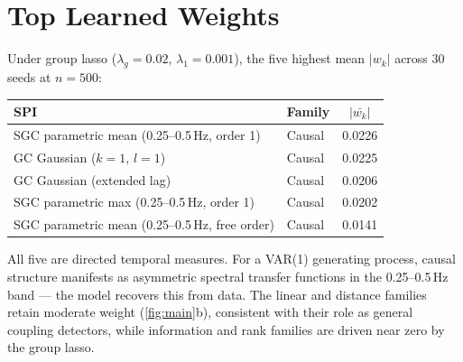 \documentclass{article}
\begin{document}
\section{Top Learned Weights}
\label{app:weights}

Under group lasso ($\lambda_g{=}0.02$, $\lambda_1{=}0.001$), the five highest mean $|w_k|$ across 30 seeds at $n{=}500$:

\begin{table}[h]
\begin{center}
\begin{small}
\begin{tabular}{llc}
\toprule
SPI & Family & $|\bar{w_k}|$ \\
\midrule
SGC parametric mean (0.25--0.5\,Hz, order 1) & Causal & 0.0226 \\
GC Gaussian ($k{=}1$, $l{=}1$) & Causal & 0.0225 \\
GC Gaussian (extended lag) & Causal & 0.0206 \\
SGC parametric max (0.25--0.5\,Hz, order 1) & Causal & 0.0202 \\
SGC parametric mean (0.25--0.5\,Hz, free order) & Causal & 0.0141 \\
\bottomrule
\end{tabular}
\end{small}
\end{center}
\end{table}

All five are directed temporal measures. For a VAR(1) generating process, causal structure manifests as asymmetric spectral transfer functions in the 0.25--0.5\,Hz band --- the model recovers this from data. The linear and distance families retain moderate weight (\cref{fig:main}b), consistent with their role as general coupling detectors, while information and rank families are driven near zero by the group lasso.
\end{document}

